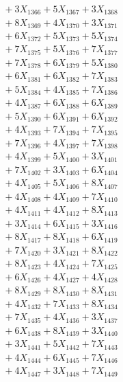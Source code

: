 \documentclass[a4paper,10pt]{article}
\begin{document}
{\begin{align}
&\;  + 3 X_{1366} + 5 X_{1367} + 3 X_{1368} \\[0.3ex]
&\;  + 8 X_{1369} + 4 X_{1370} + 3 X_{1371} \\[0.3ex]
&\;  + 6 X_{1372} + 5 X_{1373} + 5 X_{1374} \\[0.3ex]
&\;  + 7 X_{1375} + 5 X_{1376} + 7 X_{1377} \\[0.3ex]
&\;  + 7 X_{1378} + 6 X_{1379} + 5 X_{1380} \\[0.3ex]
&\;  + 6 X_{1381} + 6 X_{1382} + 7 X_{1383} \\[0.3ex]
&\;  + 5 X_{1384} + 4 X_{1385} + 7 X_{1386} \\[0.3ex]
&\;  + 4 X_{1387} + 6 X_{1388} + 6 X_{1389} \\[0.5ex]\allowbreak
&\;  + 5 X_{1390} + 6 X_{1391} + 6 X_{1392} \\[0.3ex]
&\;  + 4 X_{1393} + 7 X_{1394} + 7 X_{1395} \\[0.3ex]
&\;  + 7 X_{1396} + 4 X_{1397} + 7 X_{1398} \\[0.3ex]
&\;  + 4 X_{1399} + 5 X_{1400} + 3 X_{1401} \\[0.3ex]
&\;  + 7 X_{1402} + 3 X_{1403} + 6 X_{1404} \\[0.3ex]
&\;  + 4 X_{1405} + 5 X_{1406} + 8 X_{1407} \\[0.3ex]
&\;  + 4 X_{1408} + 4 X_{1409} + 7 X_{1410} \\[0.3ex]
&\;  + 4 X_{1411} + 4 X_{1412} + 8 X_{1413} \\[0.3ex]
&\;  + 3 X_{1414} + 6 X_{1415} + 3 X_{1416} \\[0.3ex]
&\;  + 8 X_{1417} + 8 X_{1418} + 6 X_{1419} \\[0.5ex]\allowbreak
&\;  + 7 X_{1420} + 3 X_{1421} + 8 X_{1422} \\[0.3ex]
&\;  + 8 X_{1423} + 4 X_{1424} + 7 X_{1425} \\[0.3ex]
&\;  + 6 X_{1426} + 4 X_{1427} + 4 X_{1428} \\[0.3ex]
&\;  + 8 X_{1429} + 8 X_{1430} + 8 X_{1431} \\[0.3ex]
&\;  + 4 X_{1432} + 7 X_{1433} + 8 X_{1434} \\[0.3ex]
&\;  + 7 X_{1435} + 4 X_{1436} + 3 X_{1437} \\[0.3ex]
&\;  + 6 X_{1438} + 8 X_{1439} + 3 X_{1440} \\[0.3ex]
&\;  + 3 X_{1441} + 5 X_{1442} + 7 X_{1443} \\[0.3ex]
&\;  + 4 X_{1444} + 6 X_{1445} + 7 X_{1446} \\[0.3ex]
&\;  + 4 X_{1447} + 3 X_{1448} + 7 X_{1449} \\[0.5ex]\allowbreak

\end{align}}
\end{document}
